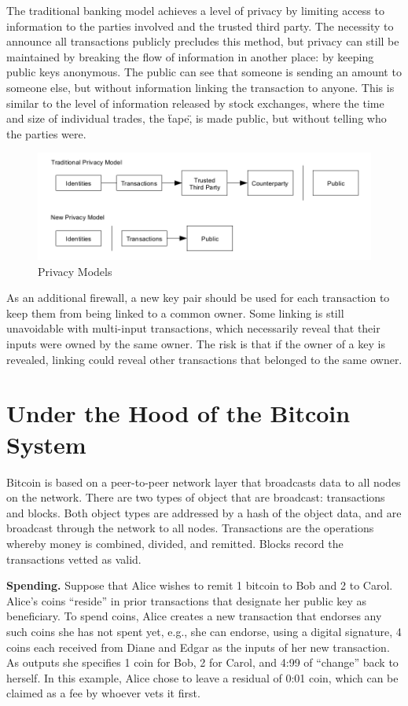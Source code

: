 The traditional banking model achieves a level of privacy by limiting access to information to the parties involved and the trusted third party. The necessity to announce all transactions publicly precludes this method, but privacy can still be maintained by breaking the flow of information in another place: by keeping public keys anonymous. The public can see that someone is sending an amount to someone else, but without information linking the transaction to anyone. This is similar to the level of information released by stock exchanges, where the time and size of individual trades, the \"tape\", is made public, but without telling who the parties were.

\begin{figure}[ht!]
\centering
\includegraphics[trim = 0mm 0mm 0mm 0mm, width=120mm]{images/traditional_privacy_model}
\caption{Privacy Models}
\end{figure}

As an additional firewall, a new key pair should be used for each transaction to keep them from being linked to a common owner. Some linking is still unavoidable with multi-input transactions, which necessarily reveal that their inputs were owned by the same owner. The risk is that if the owner of a key is revealed, linking could reveal other transactions that belonged to the same owner.

\chapter{Under the Hood of the Bitcoin System}

Bitcoin is based on a peer-to-peer network layer that broadcasts data to all nodes on
the network. There are two types of object that are broadcast: transactions and blocks.
Both object types are addressed by a hash of the object data, and are broadcast through
the network to all nodes. Transactions are the operations whereby money is combined,
divided, and remitted. Blocks record the transactions vetted as valid.

\textbf{Spending.} Suppose that Alice wishes to remit 1 bitcoin to Bob and 2 to Carol. Alice’s
coins “reside” in prior transactions that designate her public key as beneficiary. To spend
coins, Alice creates a new transaction that endorses any such coins she has not spent
yet, e.g., she can endorse, using a digital signature, 4 coins each received from Diane
and Edgar as the inputs of her new transaction. As outputs she specifies 1 coin for Bob,
2 for Carol, and 4:99 of “change” back to herself. In this example, Alice chose to leave
a residual of 0:01 coin, which can be claimed as a fee by whoever vets it first.

